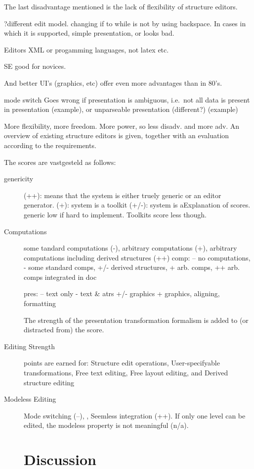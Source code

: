 
The last disadvantage mentioned is the lack of flexibility of structure editors.  

?different edit model. changing if to while is not by using backspace. In cases in which it is supported, simple presentation, or looks bad.

Editors XML or progamming languages, not latex etc.

SE good for novices.

And better UI's (graphics, etc) offer even more advantages than in 80's. 


mode switch Goes wrong if presentation is ambiguous, i.e.\ not all data is present in presentation (example), or unparseable presentation (different?) (example)


More flexibility, more freedom. More power, so less disadv. and more adv.
 An overview of existing structure editors is given, together with an evaluation according to the requirements. 


The scores are vastgesteld as follows:

\begin{description}
\item[genericity]
(++): means that the system is either truely generic or an editor generator. 
(+): system is a toolkit
(+/-): system is aExplanation of scores.
generic low if hard to implement. Toolkits score less though.

\item[Computations] some tandard computations (-), arbitrary computations (+), arbitrary computations including derived structures (++) 
comp: -- no computations, - some standard comps, +/- derived structures, +  arb. comps, ++ arb. comps integrated in doc

pres: -- text only - text \& atrs +/- graphics + graphics, aligning, formatting
 
The strength of the presentation transformation formalism is added to (or distracted from) the score.
\item[Editing Strength] points are earned for: Structure edit operations, User-specifyable transformations, Free text editing, Free layout editing, and Derived structure editing
\item[Modeless Editing] Mode switching (--), , Seemless integration (++). If only one level can be edited, the modeless property is not meaningful (n/a).
\section{Discussion}
\end{description}







